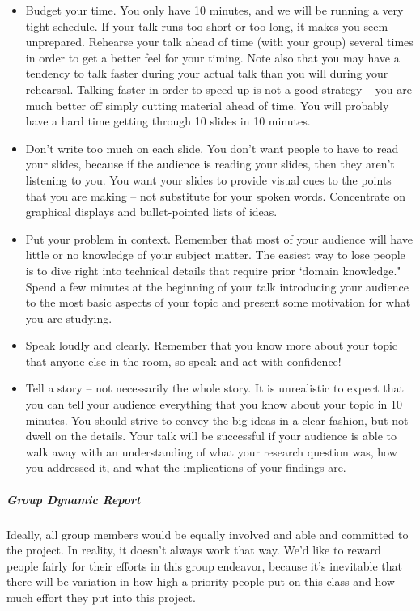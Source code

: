 \documentclass[]{article}
\let\oldsubparagraph\subparagraph
\renewcommand{\subparagraph}[1]{\oldsubparagraph{#1}\mbox{}}
\begin{document}
\begin{itemize}
\item
  Budget your time. You only have 10 minutes, and we will be running a
  very tight schedule. If your talk runs too short or too long, it makes
  you seem unprepared. Rehearse your talk ahead of time (with your
  group) several times in order to get a better feel for your timing.
  Note also that you may have a tendency to talk faster during your
  actual talk than you will during your rehearsal. Talking faster in
  order to speed up is not a good strategy -- you are much better off
  simply cutting material ahead of time. You will probably have a hard
  time getting through 10 slides in 10 minutes.
\item
  Don't write too much on each slide. You don't want people to have to
  read your slides, because if the audience is reading your slides, then
  they aren't listening to you. You want your slides to provide visual
  cues to the points that you are making -- not substitute for your
  spoken words. Concentrate on graphical displays and bullet-pointed
  lists of ideas.
\item
  Put your problem in context. Remember that most of your audience will
  have little or no knowledge of your subject matter. The easiest way to
  lose people is to dive right into technical details that require prior
  `domain knowledge." Spend a few minutes at the beginning of your talk
  introducing your audience to the most basic aspects of your topic and
  present some motivation for what you are studying.
\item
  Speak loudly and clearly. Remember that you know more about your topic
  that anyone else in the room, so speak and act with confidence!
\item
  Tell a story -- not necessarily the whole story. It is unrealistic to
  expect that you can tell your audience everything that you know about
  your topic in 10 minutes. You should strive to convey the big ideas in
  a clear fashion, but not dwell on the details. Your talk will be
  successful if your audience is able to walk away with an understanding
  of what your research question was, how you addressed it, and what the
  implications of your findings are.
\end{itemize}

\subparagraph{Group Dynamic Report}\label{group-dynamic-report}

Ideally, all group members would be equally involved and able and
committed to the project. In reality, it doesn't always work that way.
We'd like to reward people fairly for their efforts in this group
endeavor, because it's inevitable that there will be variation in how
high a priority people put on this class and how much effort they put
into this project.
\end{document}
